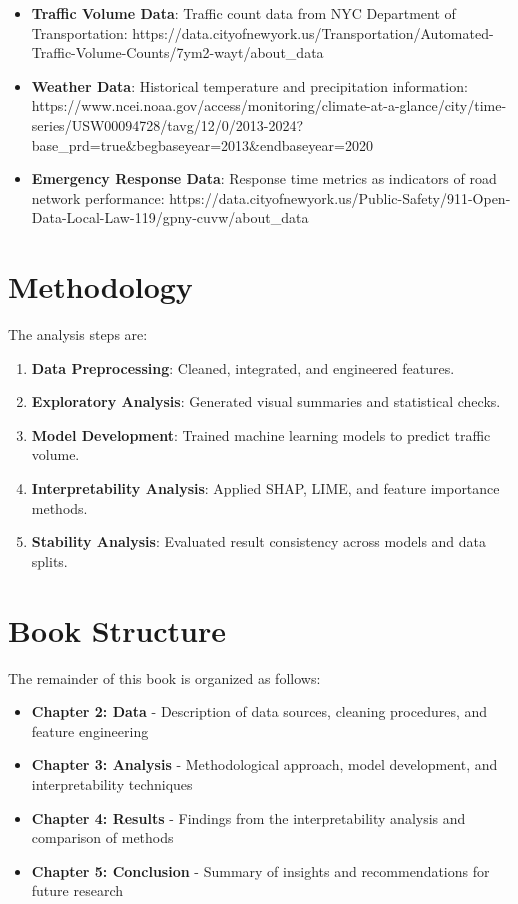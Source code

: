 \documentclass[
  letterpaper,
  DIV=11,
  numbers=noendperiod]{scrreprt}
\providecommand{\tightlist}{%
  \setlength{\itemsep}{0pt}\setlength{\parskip}{0pt}}\usepackage{longtable,booktabs,array}
\begin{document}
\begin{itemize}
\tightlist
\item
  \textbf{Traffic Volume Data}: Traffic count data from NYC Department
  of Transportation:
  https://data.cityofnewyork.us/Transportation/Automated-Traffic-Volume-Counts/7ym2-wayt/about\_data
\item
  \textbf{Weather Data}: Historical temperature and precipitation
  information:
  https://www.ncei.noaa.gov/access/monitoring/climate-at-a-glance/city/time-series/USW00094728/tavg/12/0/2013-2024?base\_prd=true\&begbaseyear=2013\&endbaseyear=2020
\item
  \textbf{Emergency Response Data}: Response time metrics as indicators
  of road network performance:
  https://data.cityofnewyork.us/Public-Safety/911-Open-Data-Local-Law-119/gpny-cuvw/about\_data
\end{itemize}

\section{Methodology}\label{methodology}

The analysis steps are:

\begin{enumerate}
\def\labelenumi{\arabic{enumi}.}
\tightlist
\item
  \textbf{Data Preprocessing}: Cleaned, integrated, and engineered
  features.
\item
  \textbf{Exploratory Analysis}: Generated visual summaries and
  statistical checks.
\item
  \textbf{Model Development}: Trained machine learning models to predict
  traffic volume.
\item
  \textbf{Interpretability Analysis}: Applied SHAP, LIME, and feature
  importance methods.
\item
  \textbf{Stability Analysis}: Evaluated result consistency across
  models and data splits.
\end{enumerate}

\section{Book Structure}\label{book-structure}

The remainder of this book is organized as follows:

\begin{itemize}
\tightlist
\item
  \textbf{Chapter 2: Data} - Description of data sources, cleaning
  procedures, and feature engineering
\item
  \textbf{Chapter 3: Analysis} - Methodological approach, model
  development, and interpretability techniques
\item
  \textbf{Chapter 4: Results} - Findings from the interpretability
  analysis and comparison of methods
\item
  \textbf{Chapter 5: Conclusion} - Summary of insights and
  recommendations for future research
\end{itemize}
\end{document}

